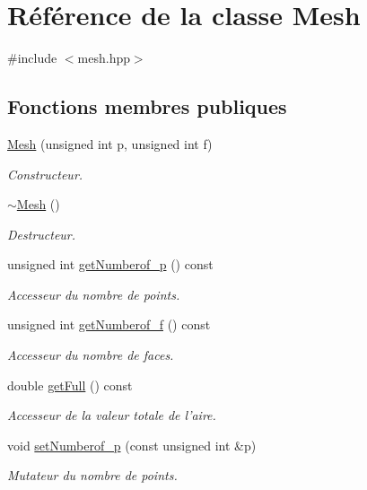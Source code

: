 \hypertarget{class_mesh}{\section{Référence de la classe Mesh}
\label{class_mesh}
}


{\ttfamily \#include $<$mesh.\-hpp$>$}

\subsection*{Fonctions membres publiques}
\begin{DoxyCompactItemize}
\item 
\hyperlink{class_mesh_a88e83e4a86e03f23069bfe397de58389}{Mesh} (unsigned int p, unsigned int f)
\begin{DoxyCompactList}\small\item\em Constructeur. \end{DoxyCompactList}\item 
\hyperlink{class_mesh_a5efe4da1a4c0971cfb037bd70304c303}{$\sim$\-Mesh} ()
\begin{DoxyCompactList}\small\item\em Destructeur. \end{DoxyCompactList}\item 
unsigned int \hyperlink{class_mesh_a9e33572dbe48c4d96f98c2731fd97dcd}{get\-Numberof\-\_\-p} () const 
\begin{DoxyCompactList}\small\item\em Accesseur du nombre de points. \end{DoxyCompactList}\item 
unsigned int \hyperlink{class_mesh_ac5fdb24c0693a8d02c739cd254b826e1}{get\-Numberof\-\_\-f} () const 
\begin{DoxyCompactList}\small\item\em Accesseur du nombre de faces. \end{DoxyCompactList}\item 
double \hyperlink{class_mesh_abf4ba84ba3a807377f391cd2bf37f2fe}{get\-Full} () const 
\begin{DoxyCompactList}\small\item\em Accesseur de la valeur totale de l'aire. \end{DoxyCompactList}\item 
void \hyperlink{class_mesh_a76b45fbfdfa33d0f0285f86a918192ba}{set\-Numberof\-\_\-p} (const unsigned int \&p)
\begin{DoxyCompactList}\small\item\em Mutateur du nombre de points. \end{DoxyCompactList}\item 

\end{DoxyCompactItemize}
